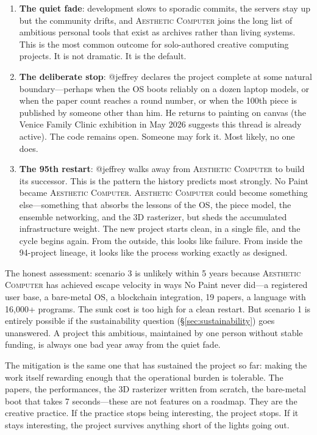 \documentclass[10pt,letterpaper,twocolumn]{article}
\newcommand{\ac}{\textsc{Aesthetic Computer}}
\begin{document}
\begin{enumerate}
  \item \textbf{The quiet fade}: development slows to sporadic commits, the servers stay up but the community drifts, and \ac{} joins the long list of ambitious personal tools that exist as archives rather than living systems. This is the most common outcome for solo-authored creative computing projects. It is not dramatic. It is the default.

  \item \textbf{The deliberate stop}: @jeffrey declares the project complete at some natural boundary---perhaps when the OS boots reliably on a dozen laptop models, or when the paper count reaches a round number, or when the 100th piece is published by someone other than him. He returns to painting on canvas (the Venice Family Clinic exhibition in May 2026 suggests this thread is already active). The code remains open. Someone may fork it. Most likely, no one does.

  \item \textbf{The 95th restart}: @jeffrey walks away from \ac{} to build its successor. This is the pattern the history predicts most strongly. No Paint became \ac{}. \ac{} could become something else---something that absorbs the lessons of the OS, the piece model, the ensemble networking, and the 3D rasterizer, but sheds the accumulated infrastructure weight. The new project starts clean, in a single file, and the cycle begins again. From the outside, this looks like failure. From inside the 94-project lineage, it looks like the process working exactly as designed.
\end{enumerate}

The honest assessment: scenario 3 is unlikely within 5 years because \ac{} has achieved escape velocity in ways No Paint never did---a registered user base, a bare-metal OS, a blockchain integration, 19 papers, a language with 16,000+ programs. The sunk cost is too high for a clean restart. But scenario 1 is entirely possible if the sustainability question (\S\ref{sec:sustainability}) goes unanswered. A project this ambitious, maintained by one person without stable funding, is always one bad year away from the quiet fade.

The mitigation is the same one that has sustained the project so far: making the work itself rewarding enough that the operational burden is tolerable. The papers, the performances, the 3D rasterizer written from scratch, the bare-metal boot that takes 7 seconds---these are not features on a roadmap. They are the creative practice. If the practice stops being interesting, the project stops. If it stays interesting, the project survives anything short of the lights going out.
\end{document}
